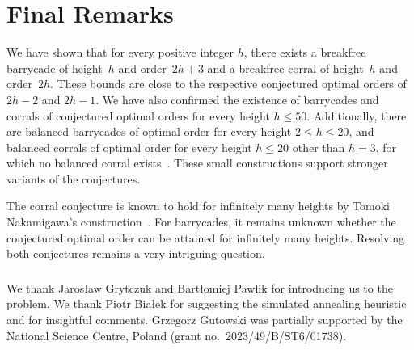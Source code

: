 \documentclass[runningheads,envcountsame]{llncs}
\newcommand{\lncs}[1]{}
\let\le\leqslant
\begin{document}
\section{Final Remarks}\label{sec:final}
We have shown that for every positive integer $h$, there exists a breakfree barrycade of height~$h$ and order~$2h+3$ and a breakfree corral of height~$h$ and order~$2h$.
These bounds are close to the respective conjectured optimal orders of $2h-2$ and $2h-1$.
We have also confirmed the existence of barrycades and corrals of conjectured optimal orders for every height $h \le 50$.
Additionally, there are balanced barrycades of optimal order for every height $2 \le h \le 20$, and balanced corrals of optimal order for every height $h \le 20$ other than $h=3$, for which no balanced corral exists~\cite{Nakamigawa2015}.
These small constructions support stronger variants of the conjectures.

The corral conjecture is known to hold for infinitely many heights by Tomoki Nakamigawa's construction~\cite{Nakamigawa2015}.
For barrycades, it remains unknown whether the conjectured optimal order can be attained for infinitely many heights.
Resolving both conjectures remains a very intriguing question.


\begin{credits}
\begin{samepage}
\subsubsection{\ackname}
We thank Jarosław Grytczuk and Bartłomiej Pawlik for introducing us to the problem.
We thank Piotr Białek for suggesting the simulated annealing heuristic and for insightful comments.
Grzegorz Gutowski was partially supported by the National Science Centre, Poland (grant no.~2023/49/B/ST6/01738).

\lncs{%
  \subsubsection{\discintname}
  The authors have no competing interests to declare that are relevant to the content of this article.%
}
\end{samepage}
\end{credits}



\end{document}
